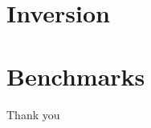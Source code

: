 \documentclass[aspectratio=169]{beamer}
\begin{document}
\section{Inversion}







\section{Benchmarks}




\begin{frame}
  \centering
  \vspace{2em}
  {\Large Thank you}\\[1em]
\end{frame}
\end{document}
